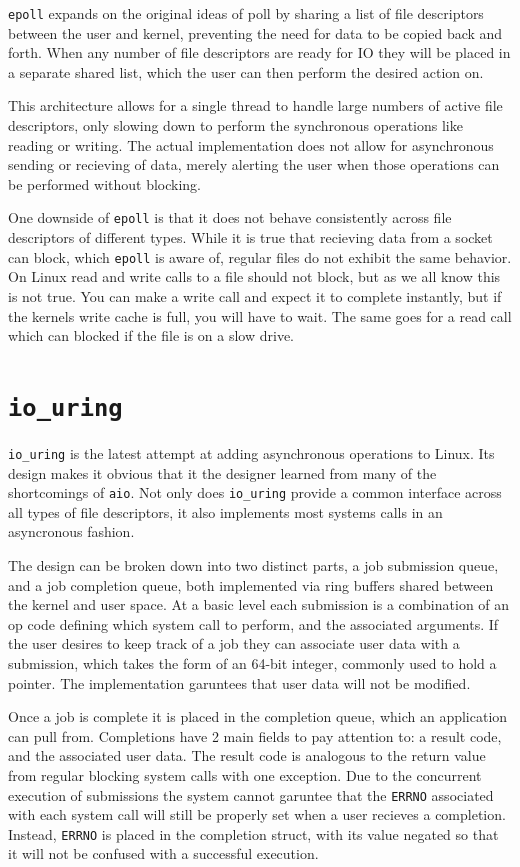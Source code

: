 \documentclass[letterpaper, 10pt, twocolumn]{article}
\begin{document}
\texttt{epoll} expands on the original ideas of poll by sharing a list of file descriptors between the user and kernel, preventing the need for data to be copied back and forth. When any number of file descriptors are ready for IO they will be placed in a separate shared list, which the user can then perform the desired action on.

This architecture allows for a single thread to handle large numbers of active file descriptors, only slowing down to perform the synchronous operations like reading or writing. The actual implementation does not allow for asynchronous sending or recieving of data, merely alerting the user when those operations can be performed without blocking.

One downside of \texttt{epoll} is that it does not behave consistently across file descriptors of different types. While it is true that recieving data from a socket can block, which \texttt{epoll} is aware of, regular files do not exhibit the same behavior. On Linux read and write calls to a file should not block, but as we all know this is not true. You can make a write call and expect it to complete instantly, but if the kernels write cache is full, you will have to wait. The same goes for a read call which can blocked if the file is on a slow drive.

\section{\texttt{io\_uring}}
\label{sec:orgd0f59ab}
\texttt{io\_uring} is the latest attempt at adding asynchronous operations to Linux. Its design makes it obvious that it the designer learned from many of the shortcomings of \texttt{aio}. Not only does \texttt{io\_uring} provide a common interface across all types of file descriptors, it also implements most systems calls in an asyncronous fashion.

The design can be broken down into two distinct parts, a job submission queue, and a job completion queue, both implemented via ring buffers shared between the kernel and user space. At a basic level each submission is a combination of an op code defining which system call to perform, and the associated arguments. If the user desires to keep track of a job they can associate user data with a submission, which takes the form of an 64-bit integer, commonly used to hold a pointer. The implementation garuntees that user data will not be modified.

Once a job is complete it is placed in the completion queue, which an application can pull from. Completions have 2 main fields to pay attention to: a result code, and the associated user data. The result code is analogous to the return value from regular blocking system calls with one exception. Due to the concurrent execution of submissions the system cannot garuntee that the \texttt{ERRNO} associated with each system call will still be properly set when a user recieves a completion. Instead, \texttt{ERRNO} is placed in the completion struct, with its value negated so that it will not be confused with a successful execution.
\end{document}
